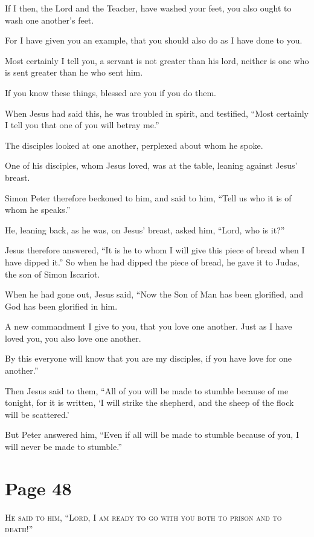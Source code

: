 If I then, the Lord and the Teacher, have washed your feet, you also ought to wash one another’s feet.

For I have given you an example, that you should also do as I have done to you.

Most certainly I tell you, a servant is not greater than his lord, neither is one who is sent greater than he who sent him.

If you know these things, blessed are you if you do them.

When Jesus had said this, he was troubled in spirit, and testified, “Most certainly I tell you that one of you will betray me.”

The disciples looked at one another, perplexed about whom he spoke.

One of his disciples, whom Jesus loved, was at the table, leaning against Jesus’ breast.

Simon Peter therefore beckoned to him, and said to him, “Tell us who it is of whom he speaks.”

He, leaning back, as he was, on Jesus’ breast, asked him, “Lord, who is it?”

Jesus therefore answered, “It is he to whom I will give this piece of bread when I have dipped it.” So when he had dipped the piece of bread, he gave it to Judas, the son of Simon Iscariot.

When he had gone out, Jesus said, “Now the Son of Man has been glorified, and God has been glorified in him.

A new commandment I give to you, that you love one another. Just as I have loved you, you also love one another.

By this everyone will know that you are my disciples, if you have love for one another.”

Then Jesus said to them, “All of you will be made to stumble because of me tonight, for it is written, ‘I will strike the shepherd, and the sheep of the flock will be scattered.’

But Peter answered him, “Even if all will be made to stumble because of you, I will never be made to stumble.”



\chapterornament
\section*{Page 48}

\lettrine{H}{e said to him, “Lord, I am ready to go with you both to prison and to death!”}

